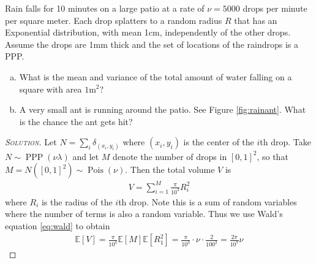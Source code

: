 \documentclass[../../../Master/AppliedStochastics.tex]{subfiles}
\newenvironment{soln}{\begin{proof}[\textsc{Solution}]}{\renewcommand{\qedsymbol}{$\blacklozenge$}\end{proof}}
\begin{document}
\begin{example}\label{ex:ant}
	Rain falls for 10 minutes on a large patio at a rate of $\nu = 5000$ drops 
	per minute per square meter. Each drop splatters to a random radius $R$ 
	that has an Exponential distribution, with mean 1cm, independently of the 
	other drops. Assume the drops are 1mm thick and the set of locations of the 
	raindrops is a PPP.
	\begin{enumerate}[(a)]
		\item What is the mean and variance of the total amount of water 
		falling on a square with area $1 \text{m}^2$?
		\item A very small ant is running around the patio. See Figure 
		\ref{fig:rainant}. What is the chance the ant gets hit?
	\end{enumerate}

\begin{soln}
	Let $N = \sum_i \delta_{(x_i,y_i)}$ where $(x_i,y_i)$ is the center of the 
	$i$th drop. Take $N \sim \operatorname{PPP}(\nu \lambda)$ and let $M$ 
	denote the number of drops in $[0,1]^2$, so that $M = N([0,1]^2) \sim 
	\operatorname{Pois}(\nu)$. Then the total volume $V$ is 
	\begin{align}
		V = \sum_{i=1}^M \frac{\pi}{10^3}R_i^2
	\end{align}
	where $R_i$ is the radius of the $i$th drop. Note this is a sum of random 
	variables where the number of terms is also a random variable. Thus we use 
	Wald's equation \eqref{eq:wald} to obtain
	\begin{align}\label{eq:usewald}
		\mathbb{E}\left[ V \right] = 
		\frac{\pi}{10^3}\mathbb{E}[M]\mathbb{E}[R_1^2] = \frac{\pi}{10^3}\cdot 
		\nu \cdot \frac{2}{100^2} = \frac{2\pi}{10^7}\nu
	\end{align}
	

\end{soln}
\end{example}
\end{document}
